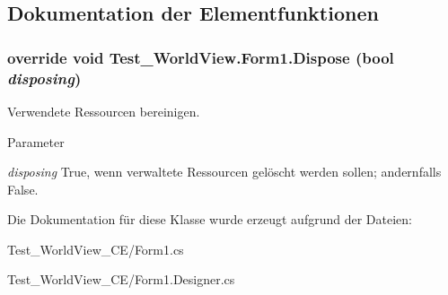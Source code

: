 \subsection{Dokumentation der Elementfunktionen}
\hypertarget{class_test___world_view_1_1_form1_aeb423a166a4e2a2273b5b825f12ecc2d}{
\subsubsection[{Dispose}]{\setlength{\rightskip}{0pt plus 5cm}override void Test\_\-WorldView.Form1.Dispose (bool {\em disposing})}}
\label{class_test___world_view_1_1_form1_aeb423a166a4e2a2273b5b825f12ecc2d}


Verwendete Ressourcen bereinigen. 


\begin{DoxyParams}{Parameter}
\item[{\em disposing}]True, wenn verwaltete Ressourcen gelöscht werden sollen; andernfalls False.\end{DoxyParams}


Die Dokumentation für diese Klasse wurde erzeugt aufgrund der Dateien:\begin{DoxyCompactItemize}
\item 
Test\_\-WorldView\_\-CE/Form1.cs\item 
Test\_\-WorldView\_\-CE/Form1.Designer.cs\end{DoxyCompactItemize}

